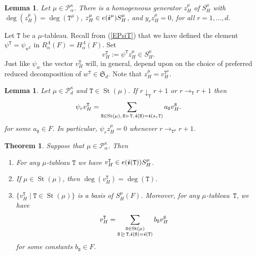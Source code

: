 \documentclass[twoside,11pt,reqno]{amsart}
\numberwithin{equation}{section}
\newtheorem{Lemma}[equation]{Lemma}
\newtheorem{Theorem}[equation]{Theorem}
\theoremstyle{definition}  %
\DeclareMathOperator\gdom {\triangleright}
\DeclareMathOperator\gedom{\trianglerighteq}
\def\bi{\text{\boldmath$i$}}
\newcommand{\St}{\operatorname{St}}
\newcommand{\Stab}{\operatorname{Stab}}
\newcommand{\0}{{\bar 0}}
\newcommand{\1}{{\bar 1}}
\newcommand{\La}{\Lambda}
\newcommand{\al}{\alpha}
\def\Si{\mathfrak{S}}
\newcommand\Par[1][]{{\mathscr P}^{\kappa#1}}
\def\T{{\mathtt T}}
\def\Stab{{\mathtt S}}
\begin{document}
\begin{Lemma}\label{LZ1} {\rm \cite[Proposition 3.7]{JM}} %
Let $\mu\in \Par_\al$. There is a homogeneous generator  $z_H^\mu$ of $S^\mu_H$ with $\deg(z_H^\mu)=\deg(\T^\mu)$, $z_H^\mu\in e(\bi^\mu)S^\mu_H$, and $y_r z_H^\mu=0$, for all $r=1,\dots,d$.
\end{Lemma}


Let $\T$ be a $\mu$-tableau. Recall from (\ref{EPsiT}) that we have defined the element 
$\psi^\T=\psi_{w^\T}$ in $R_\al^\La(F)=H_\al^\La(F)$. Set 
$$
v_H^\T:=\psi^\T z_H^\mu\in S^\mu_H.
$$
Just like $\psi_{w}$ the vector $v_H^\T$ will, in general, depend upon on the choice of preferred reduced decomposition of $w^\T\in\Si_d$. Note that $z_H^\mu=v_H^{\T^\mu}$. 


\begin{Lemma}\label{LPsiStr} {\rm \cite[Lemma 4.9]{BKW}} %
Let $\mu\in\Par_d$ and $\T \in\St(\mu)$. 
If $r\downarrow_\T  r+1$ or $r\rightarrow_\T  r+1$ %
then
$$
\psi_rv_H^\T =\sum_{\Stab\in \St(\mu),\,\Stab\gdom \T,\,\bi(\Stab)=\bi(s_r\T)}a_\Stab v_H^\Stab.
$$
for some $a_\Stab\in F$. 
In particular, $\psi_rz_H^\mu=0$ whenever $r\rightarrow_{\T^\mu}  r+1$. 
\end{Lemma}



\begin{Theorem}\label{PVZ} {\rm \cite{BKW}} %
Suppose that $\mu\in\Par_\al$. Then 
\begin{enumerate}
\item[{\rm (i)}] For any $\mu$-tableau $\T$ we have $v_H^\T\in e(\bi(\T))S^\mu_H$. 
\item[{\rm (ii)}] If $\mu\in\St(\mu)$, then $\deg(v_H^\T)=\deg(\T)$. 
\item[{\rm (iii)}] $\{v_H^\T\mid \T\in \St(\mu)\}$ is a basis of  $S_H^\mu(F)$. Moreover, for 
any $\mu$-tableau~$\T$, we have
$$
v_H^\T=\sum_{\substack{\Stab\in \St(\mu)\\\Stab\gedom \T,\bi(\Stab)=\bi(\T)}}b_\Stab v_H^\Stab
$$
for some constants $b_\Stab\in F$. 
\end{enumerate}
\end{Theorem}
\end{document}
